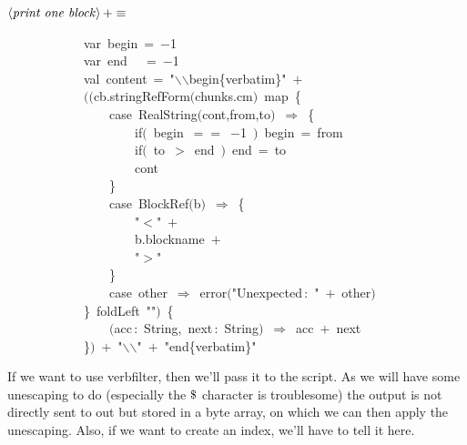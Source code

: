 \documentclass[a4paper,12pt]{article}
\begin{document}
$\left<\mbox{\emph{print one block}}\right>+\equiv$
\begin{program}~~~~~~~~~~~~{\vem var}~begin~=~$-$1
\\~~~~~~~~~~~~{\vem var}~end~~~=~$-$1
\\~~~~~~~~~~~~{\vem val}~content~=~"$\backslash$$\backslash$begin{\small\{}verbatim{\small\}}"~$+$
\\~~~~~~~~~~~~$($$($cb.stringRefForm$($chunks.cm$)$~map~{\small\{}
\\~~~~~~~~~~~~~~~~{\vem case}~RealString$($cont,from,to$)$~$\Rightarrow$~{\small\{}
\\~~~~~~~~~~~~~~~~~~~~{\vem if}$($~begin~$==$~$-$1~$)$~begin~=~from
\\[0.5em]~~~~~~~~~~~~~~~~~~~~{\vem if}$($~to~$>$~end~$)$~end~=~to
\\[0.5em]~~~~~~~~~~~~~~~~~~~~cont
\\~~~~~~~~~~~~~~~~{\small\}}
\\~~~~~~~~~~~~~~~~{\vem case}~BlockRef$($b$)$~$\Rightarrow$~{\small\{}
\\~~~~~~~~~~~~~~~~~~~~"$<$"~$+$
\\~~~~~~~~~~~~~~~~~~~~b.blockname~$+$
\\~~~~~~~~~~~~~~~~~~~~"$>$"
\\~~~~~~~~~~~~~~~~{\small\}}
\\~~~~~~~~~~~~~~~~{\vem case}~other~$\Rightarrow$~error$($"Unexpected\,{\rm :}~"~$+$~other$)$
\\~~~~~~~~~~~~{\small\}}~foldLeft~""$)$~{\small\{}
\\~~~~~~~~~~~~~~~~$($acc\,{\rm :}~String,~next\,{\rm :}~String$)$~$\Rightarrow$~acc~$+$~next
\\~~~~~~~~~~~~{\small\}}$)$~$+$~"$\backslash$$\backslash$"~$+$~"end{\small\{}verbatim{\small\}}"
\\[0.5em]\end{program}
If we want to use verbfilter, then we'll pass it to the script.
As we will have some unescaping to do (especially the $\mbox{\$}$
character is troublesome) the output is not directly sent to
out but stored in a byte array, on which we can then apply the
unescaping. Also, if we want to create an index, we'll have to tell
it here.
\end{document}

